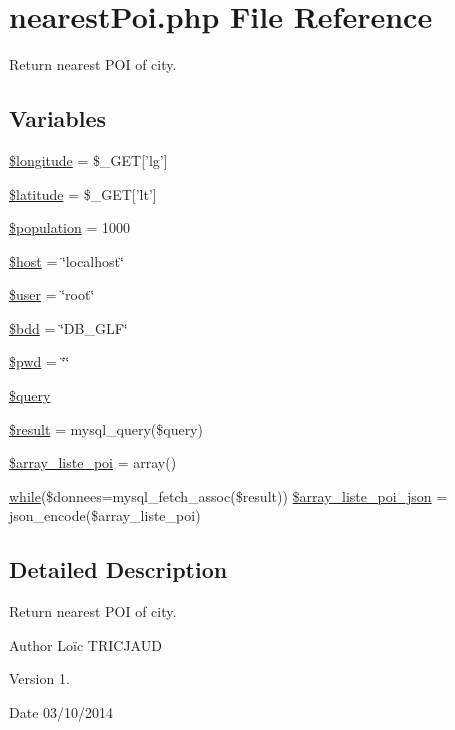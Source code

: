 \hypertarget{nearest_poi_8php}{\section{nearest\-Poi.\-php File Reference}
\label{nearest_poi_8php}
}


Return nearest P\-O\-I of city.  


\subsection*{Variables}
\begin{DoxyCompactItemize}
\item 
\hyperlink{nearest_poi_8php_aabb5b5c018fed3789fce382e336cfa47}{\$longitude} = \$\-\_\-\-G\-E\-T\mbox{[}'lg'\mbox{]}
\item 
\hyperlink{nearest_poi_8php_a5635a7326fb0b96e184ca6f5baa13e94}{\$latitude} = \$\-\_\-\-G\-E\-T\mbox{[}'lt'\mbox{]}
\item 
\hyperlink{nearest_poi_8php_afc1939ed7d0e8629546e2bc27b02dbc1}{\$population} = 1000
\item 
\hyperlink{nearest_poi_8php_a711797613cb863ca0756df789c396bf2}{\$host} = \char`\"{}localhost\char`\"{}
\item 
\hyperlink{nearest_poi_8php_a598ca4e71b15a1313ec95f0df1027ca5}{\$user} = \char`\"{}root\char`\"{}
\item 
\hyperlink{nearest_poi_8php_a94f91e878bce0991e2cd595c5dd79b3f}{\$bdd} = \char`\"{}D\-B\-\_\-\-G\-L\-F\char`\"{}
\item 
\hyperlink{nearest_poi_8php_a12e4252e778952d356721bc655cff8c8}{\$pwd} = \char`\"{}\char`\"{}
\item 
\hyperlink{nearest_poi_8php_af59a5f7cd609e592c41dc3643efd3c98}{\$query}
\item 
\hyperlink{nearest_poi_8php_a112ef069ddc0454086e3d1e6d8d55d07}{\$result} = mysql\-\_\-query(\$query)
\item 
\hyperlink{nearest_poi_8php_a3a846417945073aeceae8128dc5beb21}{\$array\-\_\-liste\-\_\-poi} = array()
\item 
\hyperlink{extract_mcdo_8php_a4eebe21070c3a655a77e55ea3fe137f5}{while}(\$donnees=mysql\-\_\-fetch\-\_\-assoc(\$result)) \hyperlink{nearest_poi_8php_a49df244be28fda7e00096232b5cd340a}{\$array\-\_\-liste\-\_\-poi\-\_\-json} = json\-\_\-encode(\$array\-\_\-liste\-\_\-poi)
\end{DoxyCompactItemize}


\subsection{Detailed Description}
Return nearest P\-O\-I of city. \begin{DoxyAuthor}{Author}
Loïc T\-R\-I\-C\-J\-A\-U\-D 
\end{DoxyAuthor}
\begin{DoxyVersion}{Version}
1. 
\end{DoxyVersion}
\begin{DoxyDate}{Date}
03/10/2014 
\end{DoxyDate}


